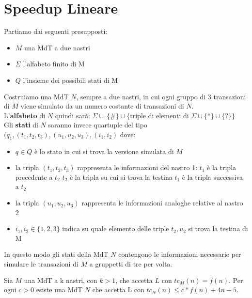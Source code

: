 \section{Speedup Lineare}

Partiamo dai seguenti presupposti:

\begin{itemize}
	\item $M$ una MdT a due nastri
	\item $\Sigma$ l'alfabeto finito di M
	\item $Q$ l'insieme dei possibili stati di M
\end{itemize}

Costruiamo una MdT $N$, sempre a due nastri, in cui ogni gruppo di 3 transazioni di $M$ viene simulato da un numero costante di transazioni di $N$. \\

L'\textbf{alfabeto} di $N$ quindi sarà: $ \Sigma \cup \ \{\#\} \cup \{ \text{triple di elementi di } \Sigma \cup \{\ast\} \cup \{?\} \} $ \\

Gli \textbf{stati} di $N$ saranno invece quartuple del tipo $(q_1, (t_1, t_2, t_3), (u_1, u_2, u_3), (i_1, i_2)$ dove:

\begin{itemize}
	\item $q \in Q$ è lo stato in cui si trova la versione simulata di $M$
	\item la tripla $(t_1, t_2, t_3)$ rappresenta le informazioni del nastro 1:
		\subitem $t_1$ è la tripla precedente a $t_2$
		\subitem $t_2$ è la tripla su cui si trova la testina
		\subitem $t_1$ è la tripla successiva a $t_2$
	\item la tripla $(u_1, u_2, u_3)$ rappresenta le informazioni analoghe relative al nastro 2
	\item $i_1, i_2 \in \{1, 2, 3\}$ indica su quale elemento delle triple $t_2, u_2$ si trova la testina di M
\end{itemize}

In questo modo gli stati della MdT $N$ contengono le informazioni necessarie per simulare le transazioni di $M$ a gruppetti di tre per volta. \\

\begin{lemm}
	Sia $M$ una MdT a k nastri, con $k > 1$, che accetta $L$ con $tc_M(n) = f(n)$.
	Per ogni $c > 0$ esiste una MdT $N$ che accetta L con $tc_N(n) \leq c*f(n) + 4n + 5$.
\end{lemm}

